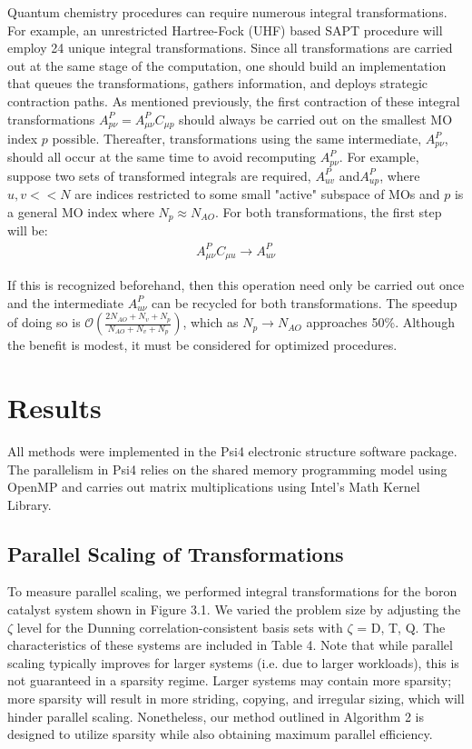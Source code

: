 Quantum chemistry procedures can require numerous integral transformations. For example, an unrestricted Hartree-Fock (UHF) based SAPT
procedure will employ
24 unique integral transformations. Since all transformations are carried out at the same stage of the computation, one should build an 
implementation that queues the transformations, gathers information, and deploys strategic contraction paths.
As mentioned previously, the first contraction of these integral transformations $A_{p \nu}^P=A_{\mu \nu}^PC_{\mu p}$ 
should always be carried out on the smallest MO index $p$ 
possible. Thereafter, transformations using the same intermediate, $A_{p \nu}^P$, should all occur at the same time to avoid
recomputing $A_{p \nu}^P$. 
For example, suppose two sets of transformed integrals are required, $A^P_{u v}$ and$A^P_{up}$, where $u,v << N$ are
indices restricted to some small "active" subspace of MOs
and $p$ is a general MO index where $N_p \approx N_{AO}$. For both transformations, the first step will be:
\begin{align} 
A^P_{\mu \nu}C_{\mu u} \rightarrow A^P_{u \nu} 
\end{align}

\noindent If this is recognized beforehand, then this operation need only be carried out once and 
the intermediate $A^P_{u \nu}$ can be recycled
for both transformations. The speedup of doing so is $\mathcal{O}(\frac{2N_{AO} + N_v + N_p}{N_{AO} + N_v + N_p})$, 
which as $N_p \rightarrow N_{AO}$ approaches
50\%. Although the benefit is modest, it must be considered for optimized procedures.

\section{Results}

All methods were implemented in the {\sc Psi4} electronic structure software package.
The parallelism in {\sc Psi4} relies on the shared memory programming model using OpenMP 
and carries out matrix multiplications using Intel's Math Kernel
Library. 


\subsection{Parallel Scaling of Transformations}

To measure parallel scaling, we performed integral transformations for the boron catalyst system shown in Figure 3.1. 
We varied the problem size by adjusting the $\zeta$ level for the Dunning correlation-consistent basis sets with $\zeta$ = D, T, Q.
The characteristics of these systems are included in Table 4. Note that while parallel scaling typically improves
for larger systems (i.e. due to larger workloads),
this is not guaranteed in a sparsity regime. Larger systems may contain more sparsity;
more sparsity will result in more striding, copying, and irregular sizing,
which will hinder parallel scaling. Nonetheless, our method outlined in Algorithm 2 is designed to utilize sparsity while also
obtaining maximum parallel efficiency. 

